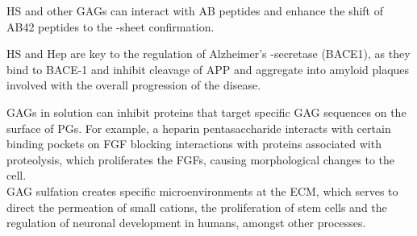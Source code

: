\documentclass[journal=jctcce,manuscript=article]{achemso}
\begin{document}
{\ac{HS} and other \acp{GAG} can interact with AB peptides and enhance the shift of AB42 peptides to the \textbeta-sheet confirmation.

\ac{HS} and \ac{Hep} are key to the regulation of Alzheimer's  \textbeta-secretase (BACE1), as they bind to BACE-1 and inhibit cleavage of \ac{APP} and aggregate into amyloid plaques involved with the overall progression of the disease.\cite{Swarup2013SugarNeurons,Scholefield2003HeparanBeta-secretase.}

GAGs in solution can inhibit proteins that target specific GAG sequences on the surface of \acp{PG}. For example, a heparin pentasaccharide interacts with certain binding pockets on \ac{FGF} blocking interactions with proteins associated with proteolysis, which proliferates the \acp{FGF}, causing morphological changes to the cell\cite{SoaresdaCosta2017SulfationDisorders}. 
\\
GAG sulfation creates specific microenvironments at the \ac{ECM}, which serves to direct the permeation of small cations, the proliferation of stem cells and the regulation of neuronal development in humans, amongst other processes. 

\afterpage{

}}
\end{document}
